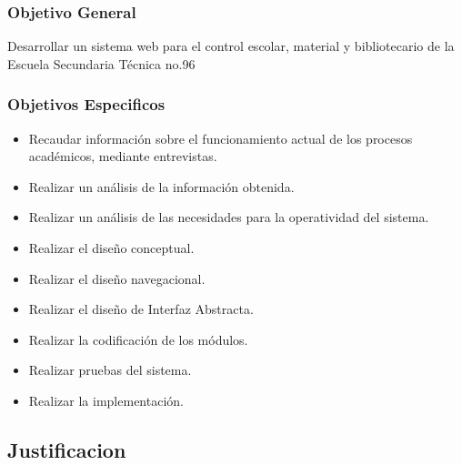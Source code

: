 \subsubsection{Objetivo General}

{\large Desarrollar un sistema web para el control escolar, material y bibliotecario de la Escuela Secundaria Técnica no.96 }\\

\subsubsection{Objetivos Especificos}

\begin{itemize}
\item Recaudar información sobre el funcionamiento actual de los procesos académicos, mediante entrevistas.
\item Realizar un análisis de la información obtenida.
\item Realizar un análisis de las necesidades para la operatividad del sistema.
\item Realizar el diseño conceptual.
\item Realizar el diseño navegacional.
\item Realizar el diseño de Interfaz Abstracta.
\item Realizar la codificación de los módulos.
\item Realizar pruebas del sistema.
\item Realizar la implementación.     
\end{itemize}

\subsection{Justificacion}

